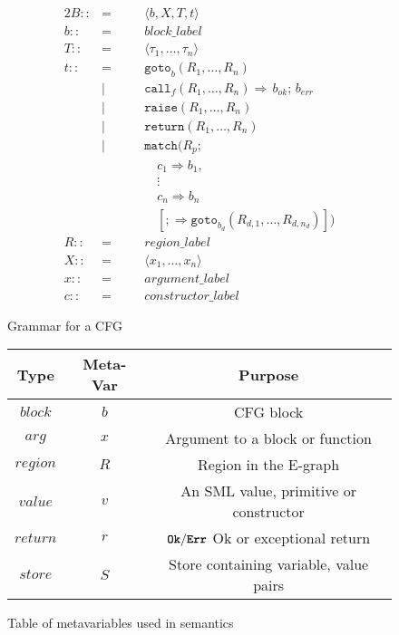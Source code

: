 \documentclass{article}
\newcommand{\bttt}[1]{\texttt{\textbf{#1}}}
\begin{document}
\begin{figure}[H]
  \centering
  \begin{alignat*}{2}
    B ::&=\quad&& \langle b, X, T, t \rangle \\
    b ::&=&& block\_label \\
    T ::&=&& \langle \tau_1, \dots, \tau_n \rangle \\
    t ::&=&& \texttt{goto}_b ( R_1, \dots, R_n ) \\
        &|&& \texttt{call}_f ( R_1, \dots, R_n) \Rightarrow \, b_{ok}; \, b_{err} \\
        &|&& \texttt{raise} ( R_1, \dots, R_n ) \\
        &|&& \texttt{return} ( R_1, \dots, R_n ) \\
        &|&& \texttt{match} ( R_p; \\
        &&&\quad c_1 \Rightarrow b_1, \\
        &&&\quad \vdots \\
        &&&\quad c_n \Rightarrow b_n \\
        &&&\quad [;\Rightarrow \texttt{goto}_{b_{d}} (R_{d,1}, \dots, R_{d,n_d})] ) \\
    R ::&=&& region\_label \\
    X ::&=&& \langle x_1, \dots, x_n \rangle \\
    x ::&=&& argument\_label \\
    c ::&=&& constructor\_label
  \end{alignat*}
  \caption{Grammar for a CFG}
  \label{fig:CFG_grammar}
\end{figure}

\begin{figure}[H]
  \centering
  \begin{tabular}{c|c|c}
    \textbf{Type} & \textbf{Meta-Var} & \textbf{Purpose} \\\hline
    $block$       & $b$               & CFG block \\\hline
    $arg$         & $x$               & Argument to a block or function \\\hline
    $region$      & $R$               & Region in the E-graph \\\hline
    $value$       & $v$               & An SML value, primitive or constructor \\\hline
    $return$      & $r$               & $\bttt{Ok}/\bttt{Err}$ Ok or exceptional return\\\hline
    $store$       & $S$               & Store containing variable, value pairs
  \end{tabular}
  \caption{Table of metavariables used in semantics}
  \label{fig:metavars}
\end{figure}
\end{document}

